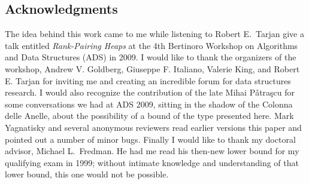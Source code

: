 
\begin{fullonly}
\section{Acknowledgments}

The idea behind this work came to me while listening to Robert E.~Tarjan give a talk entitled \emph{Rank-Pairing Heaps} 
at the 4th Bertinoro Workshop on Algorithms and Data Structures (ADS) in 2009. I would like to thank the organizers of the workshop, Andrew V. Goldberg,
Giuseppe F. Italiano,  
Valerie King, and
Robert E. Tarjan for inviting me and creating an incredible forum for data structures research.
I would also recognize the contribution of the late Mihai P\v{a}tra\c{s}cu for some conversations we had at ADS 2009, sitting in the shadow of the Colonna delle Anelle, about the possibility of a bound of the type presented here.
Mark Yagnatisky and several anonymous reviewers read earlier versions this paper and pointed out a number of minor bugs. 
Finally I would like to thank my doctoral advisor, Michael L.~Fredman. He had me read his then-new lower bound for my qualifying exam in 1999; without intimate knowledge and understanding of that lower bound, this one would not be possible.
\end{fullonly}